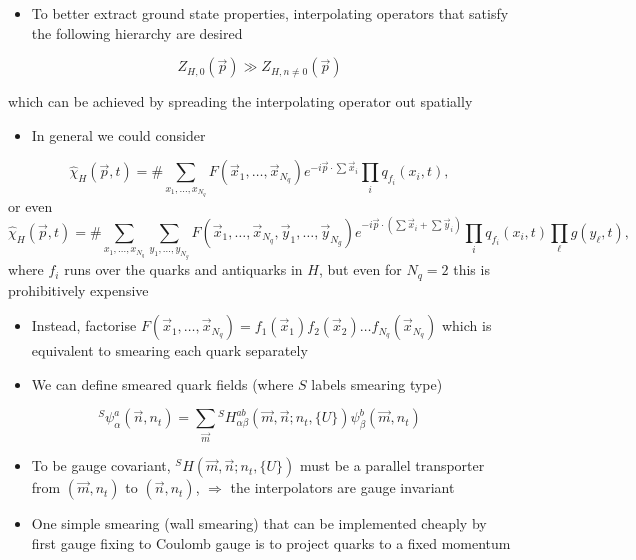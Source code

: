 \begin{itemize}
    \item To better extract ground state properties, interpolating operators that satisfy the following hierarchy are desired
\end{itemize}

\begin{equation}
Z_{H, 0}(\vec{p}) \gg Z_{H, n \neq 0}(\vec{p})
\end{equation}

which can be achieved by spreading the interpolating operator out spatially
\begin{itemize}
    \item In general we could consider
\end{itemize}
\begin{equation}
\label{eq:smear}
    \hat{\chi}_H(\vec{p}, t) = \# \sum_{x_1, \ldots, x_{N_q}} F(\vec{x}_1, \ldots, \vec{x}_{N_q}) e^{- i \vec{p} \cdot \sum \vec{x}_i} \prod_i q_{f_i}(x_i, t),
\end{equation}
or even
\begin{equation}
    \hat{\chi}_H(\vec{p}, t) = \# \sum_{x_1, \ldots, x_{N_q}} \sum_{y_1, \ldots, y_{N_g}} F(\vec{x}_1, \ldots, \vec{x}_{N_q},\vec{y}_1, \ldots, \vec{y}_{N_g}) e^{- i \vec{p} \cdot (\sum \vec{x}_i+\sum \vec{y}_i)} \prod_i q_{f_i}(x_i, t)\prod_\ell g(y_\ell, t),
\end{equation}
where $f_i$ runs over the quarks and antiquarks in $H$, but even for $N_q = 2$ this is prohibitively expensive
\begin{itemize}
    \item Instead, factorise $F(\vec{x}_1, \ldots, \vec{x}_{N_q}) = f_1(\vec{x}_1) f_2(\vec{x}_2) \ldots f_{N_q}(\vec{x}_{N_q})$ which is equivalent to smearing each quark separately
    \item We can define smeared quark fields (where $S$ labels smearing type)
\end{itemize}
\begin{equation}
    {}^S\psi_\alpha^a(\vec{n}, n_t) = \sum_{\vec{m}}{^S}H_{\alpha \beta}^{a b}(\vec{m}, \vec{n};n_t, \{ U \}) \psi_\beta^b(\vec{m},n_t)
\end{equation}
\begin{itemize}
    \item To be gauge covariant, ${}^SH(\vec{m}, \vec{n}; n_t, \{U\})$ must be a parallel transporter from $(\vec{m}, n_t)$ to $(\vec{n}, n_t)$, $\Rightarrow$ the interpolators are gauge invariant
    \item One simple smearing (wall smearing) that can be implemented cheaply by first gauge fixing to Coulomb gauge is to project quarks to a fixed momentum
\end{itemize}
